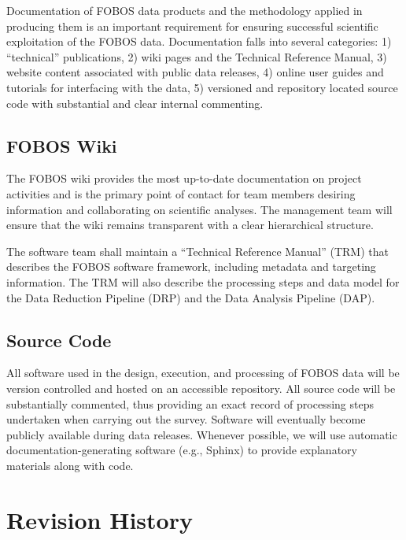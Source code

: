 \documentclass[11pt,a4paper,twoside,onecolumn,openany,final,oldfontcommands]{memoir}
\begin{document}

Documentation of FOBOS data products and the methodology applied in producing them is an important requirement for ensuring successful scientific exploitation of the FOBOS data.  Documentation falls into several categories: 1) ``technical'' publications, 2) wiki pages and the Technical Reference Manual, 3) website content associated with public data releases, 4) online user guides and tutorials for interfacing with the data, 5) versioned and repository located source code with substantial and clear internal commenting.  

\section{FOBOS Wiki}

The FOBOS wiki provides the most up-to-date documentation on project activities and is the primary point of contact for team members desiring information and collaborating on scientific analyses.  The management team will ensure that the wiki remains transparent with a clear hierarchical structure.

The software team shall maintain a ``Technical Reference Manual'' (TRM) that describes the FOBOS software framework, including metadata and targeting information.  The TRM will also describe the processing steps and data model for the Data Reduction Pipeline (DRP) and the Data Analysis Pipeline (DAP).  


\section{Source Code}

All software used in the design, execution, and processing of FOBOS data will be version controlled and hosted on an accessible repository.  All source code will be substantially commented, thus providing an exact record of processing steps undertaken when carrying out the survey.  Software will eventually become publicly available during data releases.  Whenever possible, we will use automatic documentation-generating software (e.g., Sphinx) to provide explanatory materials along with code. 

\newpage

\chapter*{Revision History}
\end{document}
